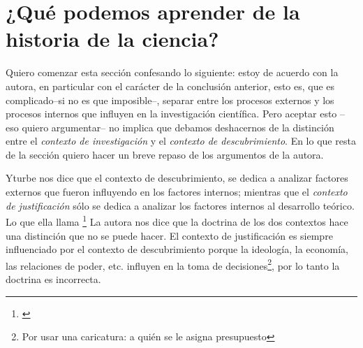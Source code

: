 

\section{¿Qué podemos aprender de la historia de la ciencia?}\label{sub:aprender}


\noindent Quiero comenzar esta sección confesando lo siguiente: estoy de acuerdo con la autora, en particular con el carácter de la conclusión anterior, esto es, que es complicado--si no es que imposible--, separar entre los procesos externos y los procesos internos que influyen en la investigación científica.
Pero aceptar esto --eso quiero argumentar-- no implica que debamos deshacernos de la distinción entre el \emph{contexto de investigación} y el \emph{contexto de descubrimiento}.
En lo que resta de la sección quiero hacer un breve repaso de los argumentos de la autora.

Yturbe nos dice que el contexto de descubrimiento, se dedica a analizar factores externos que fueron influyendo en los factores internos; mientras que el \emph{contexto de justificación} sólo se dedica a analizar los factores internos al desarrollo teórico.
Lo que ella llama \footnote{
	 \cite[p. 75]{Yturbe1995}
}
La autora nos dice que la doctrina de los dos contextos hace una distinción que no se puede hacer.
El contexto de justificación es siempre influenciado por el contexto de descubrimiento porque la ideología, la economía, las relaciones de poder, etc. influyen en la toma de decisiones\footnote{Por usar una caricatura: a quién se le asigna presupuesto}, por lo tanto la doctrina es incorrecta.

